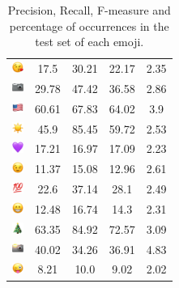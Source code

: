 \documentclass{article}
\begin{document}
\begin{table}
\begin{tabular}{|c|ccc|c|}
\includegraphics[height=0.37cm,width=0.37cm]{img/face_blowing_a_kiss.png} & 17.5 & 30.21 & 22.17 & 2.35\\ 
\includegraphics[height=0.37cm,width=0.37cm]{img/camera.png} & 29.78 & 47.42 & 36.58 & 2.86\\ 
\includegraphics[height=0.37cm,width=0.37cm]{img/United_States.png} & 60.61 & 67.83 & 64.02 & 3.9\\ 
\includegraphics[height=0.37cm,width=0.37cm]{img/sun.png} & 45.9 & 85.45 & 59.72 & 2.53\\ 
\includegraphics[height=0.37cm,width=0.37cm]{img/purple_heart.png} & 17.21 & 16.97 & 17.09 & 2.23\\ 
\includegraphics[height=0.37cm,width=0.37cm]{img/winking_face.png} & 11.37 & 15.08 & 12.96 & 2.61\\ 
\includegraphics[height=0.37cm,width=0.37cm]{img/hundred_points.png} & 22.6 & 37.14 & 28.1 & 2.49\\ 
\includegraphics[height=0.37cm,width=0.37cm]{img/beaming_face_with_smiling_eyes.png} & 12.48 & 16.74 & 14.3 & 2.31\\ 
\includegraphics[height=0.37cm,width=0.37cm]{img/Christmas_tree.png} & 63.35 & 84.92 & 72.57 & 3.09\\ 
\includegraphics[height=0.37cm,width=0.37cm]{img/camera_with_flash.png} & 40.02 & 34.26 & 36.91 & 4.83\\ 
\includegraphics[height=0.37cm,width=0.37cm]{img/winking_face_with_tongue.png} & 8.21 & 10.0 & 9.02 & 2.02\\ 

\hline
\end{tabular}
\caption{\label{table:emoji_detailed} Precision, Recall, F-measure and percentage of occurrences in the test set of each emoji.}
\end{table}
\end{document}
